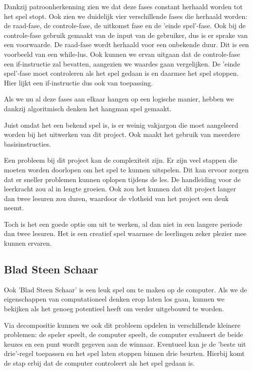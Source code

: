 Dankzij patroonherkenning zien we dat deze fases constant herhaald worden tot het spel stopt. Ook zien we duidelijk vier verschillende fases die herhaald worden: de raad-fase, de controle-fase, de uitkomst fase en de 'einde spel'-fase. Ook bij de controle-fase gebruik gemaakt van de input van de gebruiker, dus is er sprake van een voorwaarde. De raad-fase wordt herhaald voor een onbekende duur. Dit is een voorbeeld van een while-lus. Ook kunnen we ervan uitgaan dat de controle-fase een if-instructie zal bevatten, aangezien we waardes gaan vergelijken. De 'einde spel'-fase moet controleren als het spel gedaan is en daarmee het spel stoppen. Hier lijkt een if-instructie dus ook van toepassing.

Als we nu al deze fases aan elkaar hangen op een logische manier, hebben we dankzij algoritmisch denken het hangman spel gemaakt.

Juist omdat het een bekend spel is, is er weinig vakjargon die moet aangeleerd worden bij het uitwerken van dit project. Ook maakt het gebruik van meerdere basisinstructies. 

Een probleem bij dit project kan de complexiteit zijn. Er zijn veel stappen die moeten worden doorlopen om het spel te kunnen uitspelen. Dit kan ervoor zorgen dat er sneller problemen kunnen oplopen tijdens de les. De handleiding voor de leerkracht zou al in lengte groeien. Ook zou het kunnen dat dit project langer dan twee lesuren zou duren, waardoor de vlotheid van het project een deuk neemt. 

Toch is het een goede optie om uit te werken, al dan niet in een langere periode dan twee lesuren. Het is een creatief spel waarmee de leerlingen zeker plezier mee kunnen ervaren.

\subsection{Blad Steen Schaar}

Ook 'Blad Steen Schaar' is een leuk spel om te maken op de computer. Als we de eigenschappen van computationeel denken erop laten los gaan, kunnen we bekijken als het genoeg potentieel heeft om verder uitgebouwd te worden.

Via decompositie kunnen we ook dit probleem opdelen in verschillende kleinere problemen: de speler speelt, de computer speelt, de computer evalueert de beide keuzes en een punt wordt gegeven aan de winnaar. Eventueel kan je de 'beste uit drie'-regel toepassen en het spel laten stoppen binnen drie beurten. Hierbij komt de stap erbij dat de computer controleert als het spel gedaan is.

